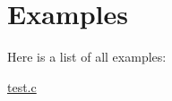 \section{Examples}
Here is a list of all examples\-:\begin{DoxyCompactItemize}
\item 
\hyperlink{test_8c-example}{test.\-c}
\end{DoxyCompactItemize}
